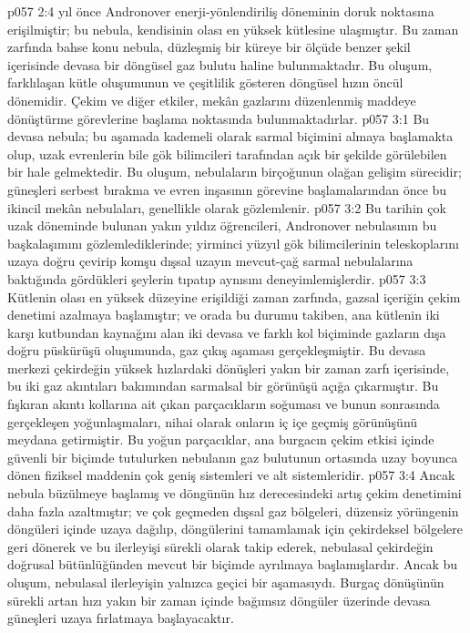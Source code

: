 \vs p057 2:4  yıl önce Andronover enerji\hyp{}yönlendiriliş döneminin doruk noktasına erişilmiştir; bu nebula, kendisinin olası en yüksek kütlesine ulaşmıştır. Bu zaman zarfında bahse konu nebula, düzleşmiş bir küreye bir ölçüde benzer şekil içerisinde devasa bir döngüsel gaz bulutu haline bulunmaktadır. Bu oluşum, farklılaşan kütle oluşumunun ve çeşitlilik gösteren döngüsel hızın öncül dönemidir. Çekim ve diğer etkiler, mekân gazlarını düzenlenmiş maddeye dönüştürme görevlerine başlama noktasında bulunmaktadırlar.
\vs p057 3:1 Bu devasa nebula; bu aşamada kademeli olarak sarmal biçimini almaya başlamakta olup, uzak evrenlerin bile gök bilimcileri tarafından açık bir şekilde görülebilen bir hale gelmektedir. Bu oluşum, nebulaların birçoğunun olağan gelişim sürecidir; güneşleri serbest bırakma ve evren inşasının görevine başlamalarından önce bu ikincil mekân nebulaları, genellikle  olarak gözlemlenir.
\vs p057 3:2 Bu tarihin çok uzak döneminde bulunan yakın yıldız öğrencileri, Andronover nebulasının bu başkalaşımını gözlemlediklerinde; yirminci yüzyıl gök bilimcilerinin teleskoplarını uzaya doğru çevirip komşu dışsal uzayın mevcut\hyp{}çağ sarmal nebulalarına baktığında gördükleri şeylerin tıpatıp aynısını deneyimlemişlerdir.
\vs p057 3:3 Kütlenin olası en yüksek düzeyine erişildiği zaman zarfında, gazsal içeriğin çekim denetimi azalmaya başlamıştır; ve orada bu durumu takiben, ana kütlenin iki karşı kutbundan kaynağını alan iki devasa ve farklı kol biçiminde gazların dışa doğru püskürüşü oluşumunda, gaz çıkış aşaması gerçekleşmiştir. Bu devasa merkezi çekirdeğin yüksek hızlardaki dönüşleri yakın bir zaman zarfı içerisinde, bu iki gaz akıntıları bakımından sarmalsal bir görünüşü açığa çıkarmıştır. Bu fışkıran akıntı kollarına ait çıkan parçacıkların soğuması ve bunun sonrasında gerçekleşen yoğunlaşmaları, nihai olarak onların iç içe geçmiş görünüşünü meydana getirmiştir. Bu yoğun parçacıklar, ana burgacın çekim etkisi içinde güvenli bir biçimde tutulurken nebulanın gaz bulutunun ortasında uzay boyunca dönen fiziksel maddenin çok geniş sistemleri ve alt sistemleridir.
\vs p057 3:4 Ancak nebula büzülmeye başlamış ve döngünün hız derecesindeki artış çekim denetimini daha fazla azaltmıştır; ve çok geçmeden dışsal gaz bölgeleri, düzensiz yörüngenin döngüleri içinde uzaya dağılıp, döngülerini tamamlamak için çekirdeksel bölgelere geri dönerek ve bu ilerleyişi sürekli olarak takip ederek, nebulasal çekirdeğin doğrusal bütünlüğünden mevcut bir biçimde ayrılmaya başlamışlardır. Ancak bu oluşum, nebulasal ilerleyişin yalnızca geçici bir aşamasıydı. Burgaç dönüşünün sürekli artan hızı yakın bir zaman içinde bağımsız döngüler üzerinde devasa güneşleri uzaya fırlatmaya başlayacaktır.
